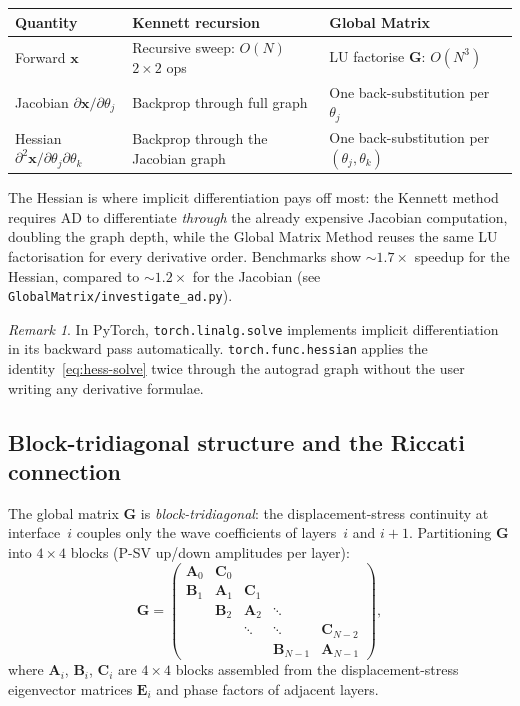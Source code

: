 \documentclass[11pt,a4paper]{article}
\theoremstyle{plain}
\theoremstyle{remark}
\newtheorem{remark}{Remark}
\begin{document}
\begin{center}
\renewcommand{\arraystretch}{1.3}
\begin{tabular}{lll}
  \toprule
  \textbf{Quantity} & \textbf{Kennett recursion} & \textbf{Global Matrix} \\
  \midrule
  Forward $\mathbf{x}$
    & Recursive sweep: $O(N)$ $2\times 2$ ops
    & LU factorise $\mathbf{G}$: $O(N^3)$ \\
  Jacobian $\partial\mathbf{x}/\partial\theta_j$
    & Backprop through full graph
    & One back-substitution per $\theta_j$ \\
  Hessian $\partial^2\mathbf{x}/\partial\theta_j\partial\theta_k$
    & Backprop through the Jacobian graph
    & One back-substitution per $(\theta_j,\theta_k)$ \\
  \bottomrule
\end{tabular}
\end{center}

\noindent The Hessian is where implicit differentiation pays off most:
the Kennett method requires AD to differentiate \emph{through} the
already expensive Jacobian computation, doubling the graph depth, while
the Global Matrix Method reuses the same LU factorisation for every
derivative order.  Benchmarks show ${\sim}1.7\times$ speedup for the
Hessian, compared to ${\sim}1.2\times$ for the Jacobian
(see \texttt{GlobalMatrix/investigate\_ad.py}).

\begin{remark}
In PyTorch, \texttt{torch.linalg.solve} implements implicit
differentiation in its backward pass automatically.
\texttt{torch.func.hessian} applies the identity~\eqref{eq:hess-solve}
twice through the autograd graph without the user writing any derivative
formulae.
\end{remark}

\subsection{Block-tridiagonal structure and the Riccati connection}%
\label{sec:riccati}

The global matrix $\mathbf{G}$ is \emph{block-tridiagonal}: the
displacement-stress continuity at interface~$i$ couples only the wave
coefficients of layers~$i$ and $i{+}1$.  Partitioning $\mathbf{G}$
into $4\times 4$ blocks (P-SV up/down amplitudes per layer):
\begin{equation}\label{eq:block-tridiag}
  \mathbf{G} =
  \begin{pmatrix}
    \mathbf{A}_0 & \mathbf{C}_0 \\
    \mathbf{B}_1 & \mathbf{A}_1 & \mathbf{C}_1 \\
    & \mathbf{B}_2 & \mathbf{A}_2 & \ddots \\
    & & \ddots & \ddots & \mathbf{C}_{N-2} \\
    & & & \mathbf{B}_{N-1} & \mathbf{A}_{N-1}
  \end{pmatrix},
\end{equation}
where $\mathbf{A}_i$, $\mathbf{B}_i$, $\mathbf{C}_i$ are $4\times 4$
blocks assembled from the displacement-stress eigenvector matrices
$\mathbf{E}_i$ and phase factors of adjacent layers.
\end{document}
